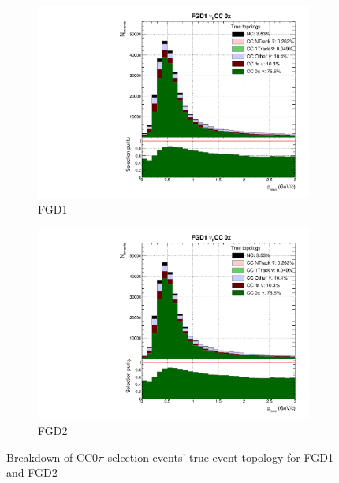 \begin{figure}[h]
	\begin{subfigure}[t]{0.49\textwidth}
		\includegraphics[width=\textwidth,page=1, trim={0mm 0mm 0mm 9mm}, clip]{figures/mach3/selection/2017b_Diag_WithSelection}
		\caption{FGD1}
	\end{subfigure}
	\begin{subfigure}[t]{0.49\textwidth}
		\includegraphics[width=\textwidth,page=7, trim={0mm 0mm 0mm 9mm}, clip]{figures/mach3/selection/2017b_Diag_WithSelection}
		\caption{FGD2}
	\end{subfigure}
	\caption{Breakdown of CC0$\pi$ selection events' true event topology for FGD1 and FGD2 }
	\label{fig:cc0pi_topology}
\end{figure}

